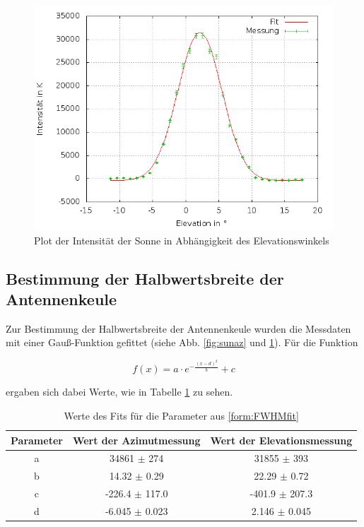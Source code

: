 \begin{figure}
		\includegraphics[width=.9\textwidth]{images/sun_elevation}
\caption{ Plot der Intensität der Sonne in Abhängigkeit des Elevationswinkels }
\label{fig:sunel}
\end{figure}

\subsection{Bestimmung der Halbwertsbreite der Antennenkeule}
Zur Bestimmung der Halbwertsbreite der Antennenkeule wurden die Messdaten mit einer Gauß-Funktion gefittet (siehe Abb. \ref{fig:sunaz} und \ref{fig:sunel}). Für die Funktion

\begin{equation}
f(x) = a \cdot e^{- \frac{(x-d)^2}{b}} + c
\label{form:FWHMfit}
\end{equation}

ergaben sich dabei Werte, wie in Tabelle \ref{tab:FWHM} zu sehen.

\begin{table}
\centering
\begin{tabular}{ccc}
Parameter	&			Wert der Azimutmessung	&	Wert der Elevationsmessung \\
\midrule
a			&			34861 $\pm$ 274			&	31855 $\pm$ 393 \\
b			&			14.32 $\pm$ 0.29		&	22.29 $\pm$ 0.72 \\
c			&			-226.4 $\pm$ 117.0		&	-401.9 $\pm$ 207.3 \\
d			&			-6.045 $\pm$ 0.023		&	2.146 $\pm$ 0.045
\end{tabular}
\caption{Werte des Fits für die Parameter aus \eqref{form:FWHMfit}}
\label{tab:FWHM}
\end{table}

